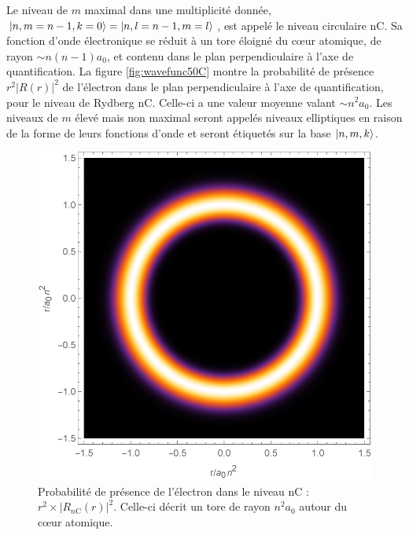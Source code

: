 Le niveau de $m$ maximal dans une multiplicité donnée, $\ket{n,m=n-1,k=0} =\ket{n,l=n-1,m=l}$, est appelé le niveau circulaire nC.
Sa fonction d'onde électronique se réduit à un tore éloigné du c\oe ur atomique, de rayon $\sim n(n-1)a_0$, et contenu dans le plan perpendiculaire à l'axe de quantification.
La figure \eqref{fig:wavefunc50C} montre la probabilité de présence $r^2|R(r)|^2$ de l'électron dans le plan perpendiculaire à l'axe de quantification, pour le niveau de Rydberg nC. Celle-ci a une valeur moyenne valant $\sim n^2 a_0$.
Les niveaux de $m$ élevé mais non maximal seront appelés niveaux elliptiques en raison de la forme de leurs fonctions d'onde et seront étiquetés sur la base $\ket{n,m,k}$.
\begin{figure}[!h]
	\centering
	\includegraphics[width=0.6\linewidth]{figures/WaveFunc_50C_}
	\caption[Fonction d'onde du niveau nC]{Probabilité de présence de l'électron dans le niveau nC : $r^2\times |R_{n\mathrm{C}}(r)|^2$.
	Celle-ci décrit un tore de rayon $n^2a_0$ autour du c\oe ur atomique.}
	\label{fig:wavefunc50C}
\end{figure}



